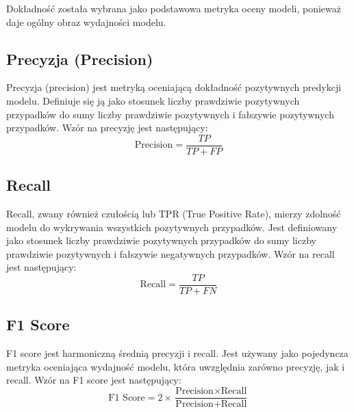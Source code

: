 Dokładność została wybrana jako podstawowa metryka oceny modeli, ponieważ daje ogólny obraz wydajności modelu.

\subsection*{Precyzja (Precision)}
Precyzja (precision) jest metryką oceniającą dokładność pozytywnych predykcji modelu. Definiuje się ją jako stosunek liczby prawdziwie pozytywnych przypadków do sumy liczby prawdziwie pozytywnych i fałszywie pozytywnych przypadków. 
Wzór na precyzję jest następujący:
\begin{equation}
\text{Precision} = \frac{TP}{TP + FP}
\end{equation}

\subsection*{Recall}
Recall, zwany również czułością lub TPR (True Positive Rate), mierzy zdolność modelu do wykrywania wszystkich pozytywnych przypadków. Jest definiowany jako stosunek liczby prawdziwie pozytywnych przypadków do sumy liczby prawdziwie 
pozytywnych i fałszywie negatywnych przypadków. Wzór na recall 
jest następujący:
\begin{equation}
\text{Recall} = \frac{TP}{TP + FN}
\end{equation}
\subsection*{F1 Score}
F1 score jest harmoniczną średnią precyzji i recall. Jest używany jako pojedyncza metryka oceniająca wydajność modelu, która uwzględnia zarówno precyzję, jak i recall. Wzór na F1 score jest następujący:
\begin{equation}
\text{F1 Score} = 2 \times \frac{\text{Precision} \times \text{Recall}}{\text{Precision} + \text{Recall}}
\end{equation}

